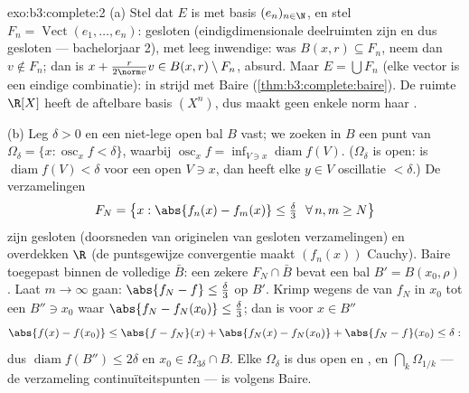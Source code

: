 \begin{solution}{exo:b3:complete:2}
(a) Stel dat $E$  is met  basis
$(e_n)_{n\in\N}$, en stel $F_n = \operatorname{Vect}(e_1, \dots,
e_n)$: gesloten (eindigdimensionale deelruimten zijn  en
dus gesloten --- bachelorjaar 2), met leeg inwendige: was $B(x, r)
\subseteq F_n$, neem dan $v \notin F_n$; dan is $x + \frac{r}{2\norm
v}v \in B(x,r) \setminus F_n$, absurd. Maar $E = \bigcup F_n$
(elke vector is een eindige combinatie): in strijd met Baire
(\cref{thm:b3:complete:baire}). De ruimte $\R[X]$ heeft de
aftelbare basis $(X^n)$, dus maakt geen enkele norm haar
.

(b) Leg $\delta > 0$ en een niet-lege open bal $B$ vast; we zoeken
in $B$ een punt van $\Omega_\delta = \{x : \operatorname{osc}_xf <
\delta\}$, waarbij $\operatorname{osc}_xf = \inf_{V \ni
x}\operatorname{diam} f(V)$. ($\Omega_\delta$ is open: is
$\operatorname{diam}f(V) < \delta$ voor een open $V \ni x$, dan
heeft elke $y \in V$ oscillatie $< \delta$.) De verzamelingen
\[
F_N = \bigl\{x : \abs{f_n(x) - f_m(x)} \leq \tfrac\delta3\
\ \forall\, n, m \geq N \bigr\}
\]
zijn gesloten (doorsneden van originelen van gesloten
verzamelingen) en overdekken $\R$ (de puntsgewijze convergentie
maakt $(f_n(x))$ Cauchy). Baire toegepast binnen de volledige
$\bar B$: een zekere $F_N \cap \bar B$ bevat een bal $B' = B(x_0,
\rho)$. Laat $m \to \infty$ gaan: $\abs{f_N - f} \leq
\frac\delta3$ op $B'$. Krimp wegens de  van $f_N$ in
$x_0$ tot een $B'' \ni x_0$ waar $\abs{f_N - f_N(x_0)} \leq
\frac\delta3$; dan is voor $x \in B''$
\[
\abs{f(x) - f(x_0)} \leq \abs{f - f_N}(x) + \abs{f_N(x) -
f_N(x_0)} + \abs{f_N - f}(x_0) \leq \delta:
\]
dus $\operatorname{diam} f(B'') \leq 2\delta$ en $x_0 \in
\Omega_{3\delta} \cap B$. Elke $\Omega_\delta$ is dus open en
, en $\bigcap_k\Omega_{1/k}$ --- de verzameling
continuïteitspunten --- is \omterm{def:b3:topology:interior}{dicht} volgens Baire.
\end{solution}


